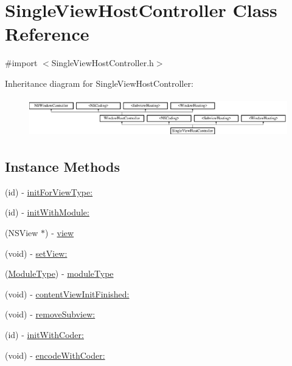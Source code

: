 \hypertarget{interface_single_view_host_controller}{\section{Single\-View\-Host\-Controller Class Reference}
\label{interface_single_view_host_controller}
}


{\ttfamily \#import $<$Single\-View\-Host\-Controller.\-h$>$}

Inheritance diagram for Single\-View\-Host\-Controller\-:\begin{figure}[H]
\begin{center}
\leavevmode
\includegraphics[height=1.707317cm]{interface_single_view_host_controller}
\end{center}
\end{figure}
\subsection*{Instance Methods}
\begin{DoxyCompactItemize}
\item 
(id) -\/ \hyperlink{interface_single_view_host_controller_ab496f2a016754b68452a127d26bb6ef9}{init\-For\-View\-Type\-:}
\item 
(id) -\/ \hyperlink{interface_single_view_host_controller_a303243594b08c9c9280b957a624edc57}{init\-With\-Module\-:}
\item 
(N\-S\-View $\ast$) -\/ \hyperlink{interface_single_view_host_controller_ac426656af30e3d0dc3b904ebcd81c38f}{view}
\item 
(void) -\/ \hyperlink{interface_single_view_host_controller_a9544a8dd4794dc764c2d74870c87ae35}{set\-View\-:}
\item 
(\hyperlink{_sword_module_8h_a224128d35337e2b42cebf846d4d0c6f1}{Module\-Type}) -\/ \hyperlink{interface_single_view_host_controller_a2e69825435ec5d0c8cd8c49f5655ab6c}{module\-Type}
\item 
(void) -\/ \hyperlink{interface_single_view_host_controller_a14ea82a054bc45c1a1c62bb7f6985da2}{content\-View\-Init\-Finished\-:}
\item 
(void) -\/ \hyperlink{interface_single_view_host_controller_afc97bbb7e9b0d2f6b9fd995ada16f4a1}{remove\-Subview\-:}
\item 
(id) -\/ \hyperlink{interface_single_view_host_controller_a6cf57c30ef62d8a0b74eafd74d0f8b39}{init\-With\-Coder\-:}
\item 
(void) -\/ \hyperlink{interface_single_view_host_controller_a958c5e82e2f22a1a132161999b5d1704}{encode\-With\-Coder\-:}
\end{DoxyCompactItemize}
